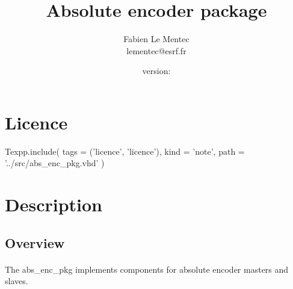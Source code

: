 \documentclass[12pt]{article}
\begin{document}

\newcommand{\todo}[1]
{\paragraph{}\textbf{TODO}: #1}

{\lstset{language=VHDL, basicstyle=\tiny, frame=single}}{}

{\lstset{frame=single}}{}

\newcommand{\longurl}[2]
{\url{#1#2}}

\newcommand{\longlongurl}[3]
{\url{#1#2#3}}

{}{\newcommand{\version}{none}}





\title{Absolute encoder package}
\author{Fabien Le Mentec \\ lementec@esrf.fr}
\date{\small{version: \version}}
\maketitle


\newpage
\setcounter{tocdepth}{2}
\tableofcontents


\newpage
\section{Licence}
\begin{texpp}
Texpp.include(
 tags = ('licence', 'licence'),
 kind = 'note',
 path = '../src/abs_enc_pkg.vhd'
)
\end{texpp}


\newpage
\section{Description}

\subsection{Overview}
\paragraph{}
The abs\_enc\_pkg implements components for absolute encoder masters and
slaves.
\end{document}
